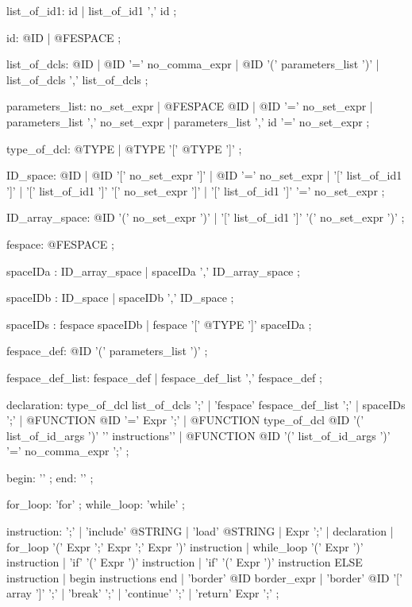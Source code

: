 \documentclass[twoside]{book}
\begin{document}
list_of_id1:  id                     
            | list_of_id1 ',' id   ;
         
id: @ID | @FESPACE ; 

list_of_dcls:    @ID                          
              |  @ID '='   no_comma_expr     
              |  @ID  '(' parameters_list ')' 
              |  list_of_dcls ',' list_of_dcls  ;


parameters_list:
           no_set_expr  
        |  @FESPACE  @ID  
        |  @ID '=' no_set_expr        
        | parameters_list ',' no_set_expr
        | parameters_list ',' id '=' no_set_expr ; 

type_of_dcl:   @TYPE 
             | @TYPE '[' @TYPE ']' ;

ID_space:
    @ID                                 
 |  @ID '[' no_set_expr ']'              
 |  @ID '=' no_set_expr                  
 |  '[' list_of_id1 ']'                
 |  '[' list_of_id1 ']' '[' no_set_expr ']'  
 |  '[' list_of_id1 ']' '=' no_set_expr ;
 
ID_array_space:
    @ID '(' no_set_expr ')'              
 |  '[' list_of_id1 ']' '(' no_set_expr ')' ;

fespace: @FESPACE ;

spaceIDa  :      ID_array_space
            |    spaceIDa ',' ID_array_space  ;
            
spaceIDb  :      ID_space 
            |    spaceIDb ',' ID_space ;

spaceIDs :    fespace               spaceIDb    
           |  fespace '[' @TYPE ']'  spaceIDa    ;

fespace_def: @ID '(' parameters_list ')' ;
     
fespace_def_list:  fespace_def
                 | fespace_def_list ',' fespace_def ;


declaration:   type_of_dcl list_of_dcls ';' 
             | 'fespace' fespace_def_list    ';' 
             | spaceIDs ';'
             | @FUNCTION @ID '=' Expr ';' 
             | @FUNCTION type_of_dcl @ID  '(' list_of_id_args ')'  '{' instructions'}'                     
             | @FUNCTION @ID '(' list_of_id_args ')'   '='   no_comma_expr  ';'     ;              

begin: '{'  ;
end:   '}'  ;

for_loop:    'for'   ;  
while_loop:  'while' ;

instruction:   ';' 
         | 'include'  @STRING  
         | 'load'  @STRING           
         |  Expr  ';' 
         |  declaration  
         |  for_loop  '(' Expr ';' Expr ';' Expr ')' instruction  
         |  while_loop '(' Expr ')' instruction 
         |  'if' '(' Expr ')'   instruction  
         |  'if' '(' Expr ')'   instruction  ELSE instruction 
         |  begin  instructions end 
         |  'border'  @ID   border_expr 
         |  'border'   @ID   '['  array ']' ';'                               
         |  'break'  ';' 
         |  'continue'  ';' 
         |  'return'  Expr ';'  ;
\end{document}
